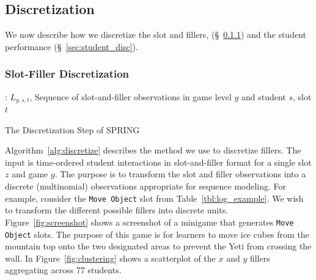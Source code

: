 \documentclass{sigchi}
\def\algname{SPRING\xspace}
\begin{document}
\subsection{Discretization}
We now describe how we discretize
the slot and fillers,  (\S~\ref{sec:filler_disc}) 
and the student performance (\S~\ref{sec:student_disc}).

\subsubsection{Slot-Filler Discretization}
\label{sec:filler_disc}

\begin{algorithm}[ht]
	\begin{algorithmic}[1]
		\Require: $L_{g,s,t}$, Sequence of slot-and-filler observations in game level $g$ and student $s$, slot $t$
		
	
		\State
					\EndIf
				\EndFor
		\EndFor
		\State {}
		\EndProcedure
		
	\end{algorithmic}
	\caption{The Discretization Step of \algname \label{alg:discretize}}
\end{algorithm}


Algorithm~\ref{alg:discretize} describes the method we use to discretize fillers.
The input is time-ordered student interactions in slot-and-filler format for a single slot $z$ and game $g$.
The purpose is to transform the slot and filler observations into a discrete (multinomial) observations appropriate for sequence modeling.
For example, consider the \texttt{Move Object} slot from Table~\ref{tbl:log_example}.
We wish to transform the different possible fillers into discrete units.
Figure~\ref{fig:screenshot} shows a screenshot of a minigame that generates  \texttt{Move Object} slots.
The purpose of this game is for learners to move ice cubes from the mountain top onto the two designated areas to prevent the Yeti from crossing the wall.
In Figure~\ref{fig:clustering} shows a scatterplot of the $x$ and $y$ fillers aggregating across 77 students.
\end{document}
